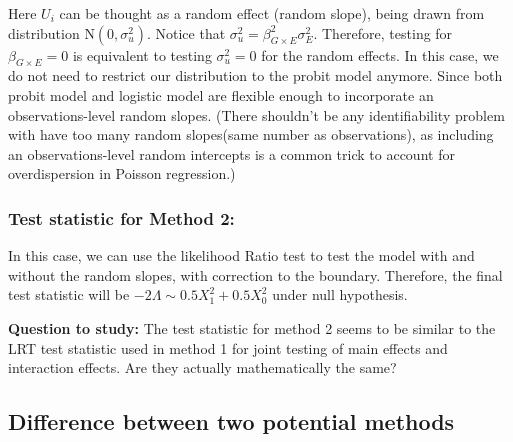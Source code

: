 \documentclass[]{article}
\begin{document}
Here \(U_i\) can be thought as a random effect (random slope), being
drawn from distribution \(\text{N}(0,\sigma_u^2)\). Notice that
\(\sigma_u^2 = \beta_{G\times E}^2 \sigma_E^2\). Therefore, testing for
\(\beta_{G\times E} =0\) is equivalent to testing \(\sigma_u^2 = 0\) for
the random effects. In this case, we do not need to restrict our
distribution to the probit model anymore. Since both probit model and
logistic model are flexible enough to incorporate an observations-level
random slopes. (There shouldn't be any identifiability problem with have
too many random slopes(same number as observations), as including an
observations-level random intercepts is a common trick to account for
overdispersion in Poisson regression.)

\hypertarget{test-statistic-for-method-2}{%
\subsubsection{Test statistic for Method
2:}\label{test-statistic-for-method-2}}

In this case, we can use the likelihood Ratio test to test the model
with and without the random slopes, with correction to the boundary.
Therefore, the final test statistic will be
\(-2\Lambda \sim 0.5X^2_1 + 0.5X^2_0\) under null hypothesis.

\textbf{Question to study:} The test statistic for method 2 seems to be
similar to the LRT test statistic used in method 1 for joint testing of
main effects and interaction effects. Are they actually mathematically
the same?

\hypertarget{difference-between-two-potential-methods}{%
\subsection{Difference between two potential
methods}\label{difference-between-two-potential-methods}}
\end{document}
